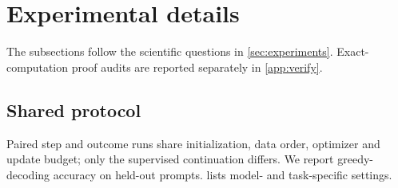 \begin{table}[h]
\centering\small
{}
\caption{\textbf{Reduced gate flow: every run solves, and solve times grow far more slowly than the proved bound.} $K=2$ integrates \cref{eq:J-flow}; $K=3,4,6$ integrate the reduction of \cref{lem:J-generalK}(a). Each row: $p\in\{0.1,0.25,0.75\}$, $\initscale\in\{0.3,0.2,0.1\}$, three seeds, $d_{\mathrm h}=8$; these $\initscale$ lie outside the range of \cref{thm:joint}. Checks: $g$ keeps its sign after prior fitting, $a$ crosses zero at most once, and below $H_p$, $ag<0$ with $|a|$ nondecreasing (vacuous for one $K=3$ run with a single sample below $H_p$). Implementation: \texttt{handcoded/reduced\_ode.py}.}
\label{tab:J-ode}
\end{table}

\section{Experimental details}
\label{app:experiments}
\label{app:experimental-details}
The subsections follow the scientific questions in \cref{sec:experiments}. Exact-computation proof audits are reported separately in \cref{app:verify}.

\subsection{Shared protocol}
\label{app:letter-protocol}
Paired step and outcome runs share initialization, data order, optimizer and update budget; only the supervised continuation differs.
We report greedy-decoding accuracy on held-out prompts.  lists model- and task-specific settings.

